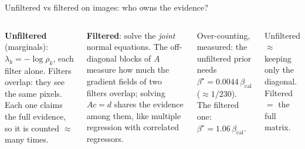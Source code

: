 \documentclass[10pt,aspectratio=169]{beamer}
\newcommand{\E}{\mathbb{E}}
\newcommand{\inner}[2]{\langle #1,#2\rangle}
\newcommand{\bcal}{\beta_{\mathrm{cal}}}
\begin{document}
\begin{frame}{Unfiltered vs filtered on images: who owns the evidence?}
\begin{columns}[T]
\textbf{Unfiltered} (marginals): $\lambda_k=-\log\rho_k$, each filter alone.
Filters overlap: they see the same pixels. Each one claims the full evidence, so it is
counted $\approx$ many times.

\medskip
\textbf{Filtered}: solve the \emph{joint} normal equations. The off-diagonal blocks of $A$
measure how much the gradient fields of two filters overlap; solving $Ac=d$ shares the
evidence among them, like multiple regression with correlated regressors.

\medskip
\begin{keybox}
Over-counting, measured: the unfiltered prior needs $\beta^\star=\mathbf{0.0044}\,\bcal$
($\approx 1/230$). The filtered one: $\beta^\star=\mathbf{1.06}\,\bcal$.
\end{keybox}
\centering
{}

\vspace{2mm}
\small Unfiltered $\approx$ keeping only the diagonal.\\ Filtered $=$ the full matrix.
\end{columns}
\end{frame}
\end{document}
